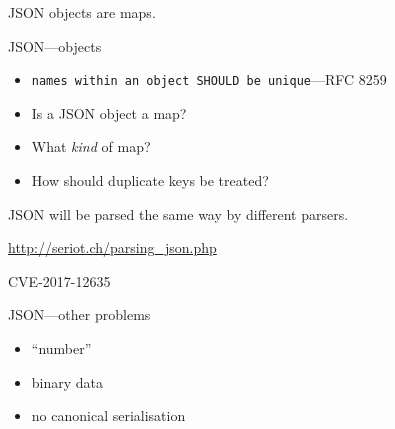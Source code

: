 \documentclass[ignorenonframetext,aspectratio=43]{beamer}
\providecommand{\tightlist}{%
  \setlength{\itemsep}{0pt}\setlength{\parskip}{0pt}}
\begin{document}
\begin{frame}[plain]
\huge
JSON objects are maps.
\end{frame}

\begin{frame}{JSON---objects}
\begin{itemize}
\tightlist
\item \texttt{names within an object SHOULD be unique}---RFC 8259
\item Is a JSON object a map?
\item What {\em kind} of map?
\item How should duplicate keys be treated?
\end{itemize}
\end{frame}

\begin{frame}[plain]
\huge
JSON will be parsed the same way by different parsers.
\end{frame}

\begin{frame}[plain]
\begin{center}
\end{center}
\tiny \url{http://seriot.ch/parsing_json.php}
\end{frame}

\begin{frame}
\centering
\LARGE
CVE-2017-12635
\end{frame}

\begin{frame}{JSON---other problems}
\begin{itemize}
\tightlist
\item ``number''
\item binary data
\item no canonical serialisation
\end{itemize}
\end{frame}

\begin{frame}[plain]
\begin{center}
\end{center}
\end{frame}
\end{document}
